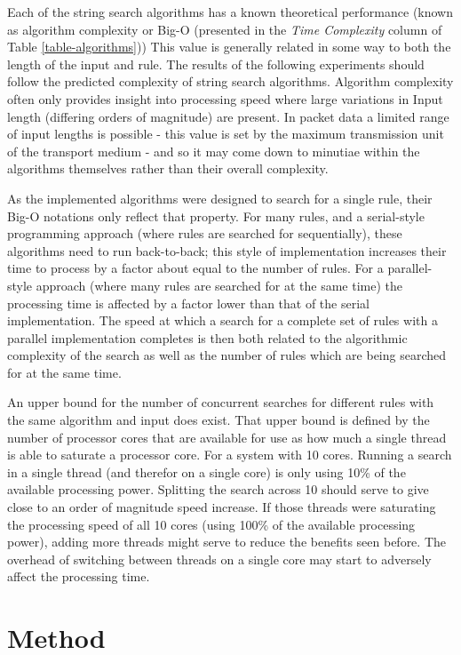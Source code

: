 \documentclass[11pt]{article}
\begin{document}
Each of the string search algorithms has a known theoretical performance (known as algorithm complexity or  Big-O (presented in the \textit{Time Complexity} column of Table \ref{table-algorithms})) This value is generally related in some way to both the length of the input and rule. The results of the following experiments should follow the predicted complexity of string search algorithms. Algorithm complexity often only provides insight into processing speed where large variations in Input length (differing orders of magnitude) are present. In packet data a limited range of input lengths is possible - this value is set by the maximum transmission unit of the transport medium - and so it may come down to minutiae within the algorithms themselves rather than their overall complexity.

As the implemented algorithms were designed to search for a single rule, their Big-O notations only reflect that property. For many rules, and a serial-style programming approach (where rules are searched for sequentially), these algorithms need to run back-to-back; this style of implementation increases their time to process by a factor about equal to the number of rules. For a parallel-style approach (where many rules are searched for at the same time) the processing time is affected by a factor lower than that of the serial implementation. The speed at which a search for a complete set of rules with a parallel implementation completes is then both related to the algorithmic complexity of the search as well as the number of rules which are being searched for at the same time.

An upper bound for the number of concurrent searches for different rules with the same algorithm and input does exist. That upper bound is defined by the number of processor cores that are available for use as how much a single thread is able to saturate a processor core.
For a system with 10 cores. Running a search in a single thread (and therefor on a single core) is only using 10\% of the available processing power. Splitting the search across 10 should serve to give close to an order of magnitude speed increase. If those threads were saturating the processing speed of all 10 cores (using 100\% of the available processing power), adding more threads might serve to reduce the benefits seen before. The overhead of switching between threads on a single core may start to adversely affect the processing time.

\section{Method}
\end{document}
